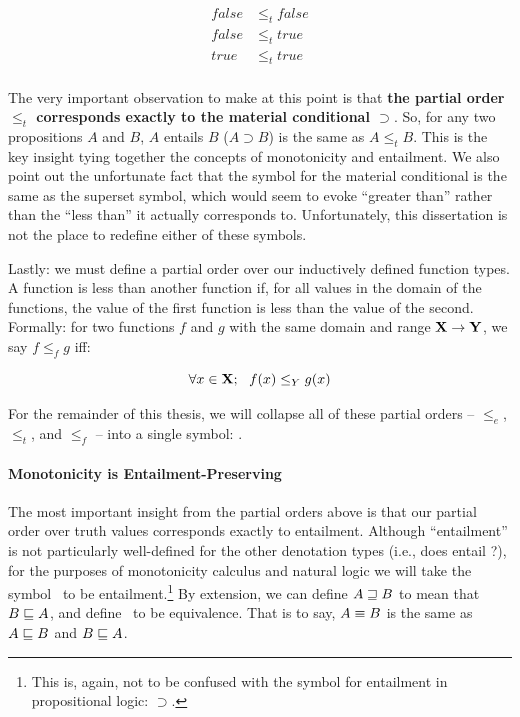 \begin{align*}
  false &\leq_t false \\
  false &\leq_t true \\
  true &\leq_t true \\
\end{align*}

The very important observation to make at this point is that
  \textbf{the partial order $\leq_t$ corresponds exactly to the material conditional $\supset$}.
So, for any two propositions $A$ and $B$, $A$ entails $B$ ($A \supset B$) is the same
  as $A \leq_t B$.
This is the key insight tying together the concepts of monotonicity and entailment.
We also point out the unfortunate fact that the symbol for the material conditional
  is the same as the superset symbol, which would seem to evoke ``greater than'' rather
  than the ``less than'' it actually corresponds to.
Unfortunately, this dissertation is not the place to redefine either of these symbols.

Lastly: we must define a partial order over our inductively defined function types.
A function is less than another function if, for all
  values in the domain of the functions, the value of the first function is less than
  the value of the second.
Formally: for two functions $f$ and $g$ with the same domain and range $\mathbf{X} \rightarrow \mathbf{Y}$,
  we say $f \leq_f g$ iff:

\begin{equation}
  \forall x \in \mathbf{X}; ~~ f(x) \leq_Y g(x)
\end{equation}

For the remainder of this thesis, we will collapse all of these partial orders
  -- $\leq_e$, $\leq_t$, and $\leq_f$ -- into
  a single symbol: \forward.



\paragraph{Monotonicity is Entailment-Preserving}
The most important insight from the partial orders above is that our partial order
  over truth values corresponds exactly to entailment.
Although ``entailment'' is not particularly well-defined for the other denotation
  types (i.e., does  entail ?), for the purposes of monotonicity
  calculus and natural logic we will take the symbol \forward\ to be entailment.\footnote{
    This is, again, not to be confused with the symbol for entailment in propositional
    logic: $\supset$.
  }
By extension, we can define $A \sqsupseteq B$ to mean that $B \sqsubseteq A$, and define
  \equivalent\ to be equivalence.
That is to say, $A \equiv B$ is the same as $A \sqsubseteq B$ and $B \sqsubseteq A$.

